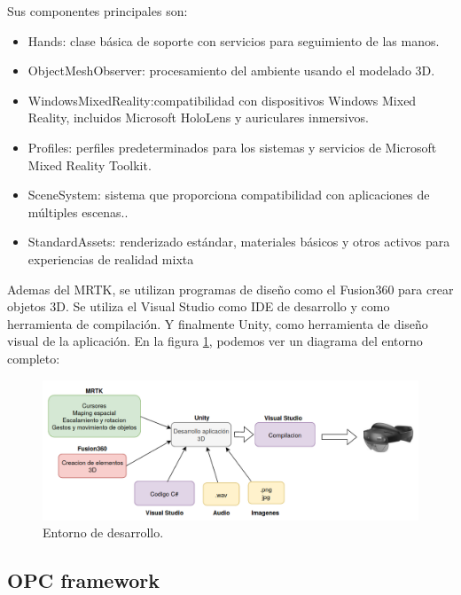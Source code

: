 
Sus componentes principales son:
\begin{itemize}
\item Hands: clase básica de soporte con servicios para seguimiento de las manos.
\item ObjectMeshObserver: procesamiento del ambiente usando el modelado 3D.
\item WindowsMixedReality:compatibilidad con dispositivos Windows Mixed Reality, incluidos Microsoft HoloLens y auriculares inmersivos.
\item Profiles: perfiles predeterminados para los sistemas y servicios de Microsoft Mixed Reality Toolkit.
\item SceneSystem: sistema que proporciona compatibilidad con aplicaciones de múltiples escenas..
\item StandardAssets: renderizado estándar, materiales básicos y otros activos para experiencias de realidad mixta
\end{itemize}

Ademas del MRTK, se utilizan programas de diseño como el Fusion360 para crear objetos 3D. Se utiliza el Visual Studio como IDE de desarrollo y como herramienta de compilación. Y finalmente Unity, como herramienta de diseño visual de la aplicación. En la figura \ref{fig:workflow}, podemos ver un diagrama del entorno completo:

\begin{figure}[htpb]
	\centering
	\includegraphics[width=\textwidth]{./Figures/workflow.png}
	\caption{Entorno de desarrollo\protect\footnotemark.}
	\label{fig:workflow}
\end{figure}


\subsection{OPC framework}

